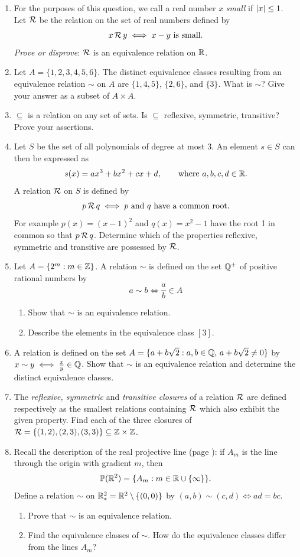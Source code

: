 \begin{exercises}{}{}
\begin{enumerate}
	\item For the purposes of this question, we call a real number $x$ \emph{small} if $\left| x\right|\le 1$. Let $\mathcal{R}$ be the relation on the set of real numbers defined by
	\[x\,\mathcal{R}\,y \iff x-y \text{ is small}.\]
	\emph{Prove or disprove}: $\mathcal{R}$ is an equivalence relation on $\mathbb{R}$.

	\item Let $A=\{1,2,3,4,5,6\}$. The distinct equivalence classes resulting from an equivalence relation $\sim$ on $A$ are $\{1,4,5\}$, $\{2,6\}$, and $\{3\}$. What is $\sim$? Give your answer as a subset of $A\times A$.

	\item $\subseteq$ is a relation on any set of sets. Is $\subseteq$ reflexive, symmetric, transitive? Prove your assertions.

	\item Let $S$ be the set of all polynomials of degree at most 3. An element $s\in S$ can then be expressed as
  \[s(x)=ax^3+bx^2+cx+d,\qquad\text{where $a,b,c,d\in\mathbb{R}$.}\]
  A relation $\mathcal{R}$ on $S$ is defined by
  \[p\,\mathcal{R}\,q\iff p\text{ and $q$ have a common root.}\]
  For example $p(x)=(x-1)^2$ and $q(x)=x^2-1$ have the root 1 in common so that $p\,\mathcal{R}\,q$. Determine which of the properties reflexive, symmetric and transitive are possessed by $\mathcal{R}$.

  \item Let $A=\{2^m:m\in\mathbb{Z}\}$. A relation $\sim$ is defined on the set $\mathbb{Q}^+$ of positive rational numbers by
  \[a\sim b\iff \frac ab\in A\]
  \begin{enumerate}
    \item Show that $\sim$ is an equivalence relation.
    \item Describe the elements in the equivalence class $[3]$.
  \end{enumerate}

  \item A relation is defined on the set $A=\{a+b\sqrt 2:a,b\in\mathbb{Q},\,a+b\sqrt 2\neq 0\}$ by $x\sim y\iff \frac xy\in\mathbb{Q}$. Show that $\sim$ is an equivalence relation and determine the distinct equivalence classes.

	\item The \emph{reflexive, symmetric} and \emph{transitive closures} of a relation $\mathcal{R}$ are defined respectively as the smallest relations containing $\mathcal{R}$ which also exhibit the given property. Find each of the three closures of $\mathcal{R}=\{(1,2),(2,3),(3,3)\}\subseteq\mathbb{Z}\times\mathbb{Z}$.

	\item Recall the description of the real projective line (page \pageref{ex:projline}): if $A_m$ is the line through the origin with gradient $m$, then
	\[\mathbb{P}(\mathbb{R}^2)=\{A_m:m\in\mathbb{R}\cup\{\infty\}\}.\]
	Define a relation $\sim$ on $\mathbb{R}^2_*=\mathbb{R}^2\setminus\{(0,0)\}$ by $(a,b)\sim(c,d)\iff ad=bc$.
	\begin{enumerate}
	  \item Prove that $\sim$ is an equivalence relation.
	  \item Find the equivalence classes of $\sim$. How do the equivalence classes differ from the lines $A_m$?
	\end{enumerate}
  

\end{enumerate}
\end{exercises}
